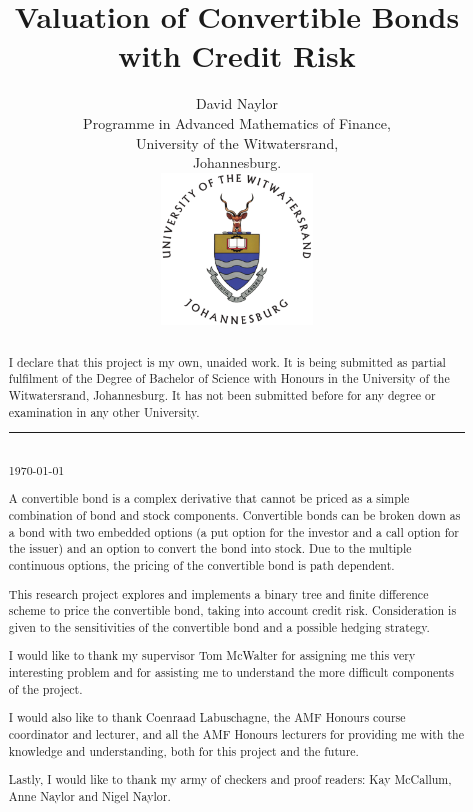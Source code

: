 \documentclass[a4paper,11pt,oneside]{report}
\title{Valuation of Convertible Bonds with Credit Risk}
\author{David Naylor\\[2cm]
Programme in Advanced Mathematics of Finance,\\
University of the Witwatersrand,\\
Johannesburg.\\[2cm]
\includegraphics[width=4cm]{../common/WitsColourLogo}\\[2cm]
}
\newcommand{\setlinespacing}[1]
           {\renewcommand{\baselinestretch}{#1}\small\normalsize}
\theoremstyle{plain}
\theoremstyle{definition}
\begin{document}
\maketitle \setlinespacing{1.20}


\def\abstractname{\Huge Declaration}
\begin{abstract}
I declare that this project is my own, unaided work. It is being submitted as partial fulfilment of the Degree of Bachelor of Science with Honours in the University of the Witwatersrand, Johannesburg. It has not been submitted before for any degree or examination in any other University.\\[3cm]
\noindent\rule{5cm}{0.5pt}\\[1cm]
\noindent \today
\end{abstract}


\def\abstractname{\Huge Abstract}
\begin{abstract}
A convertible bond is a complex derivative that cannot be priced as a simple combination of bond and stock components.  Convertible bonds can be broken down as a bond with two embedded options (a put option for the investor and a call option for the issuer) and an option to convert the bond into stock.  Due to the multiple continuous options, the pricing of the convertible bond is path dependent.

This research project explores and implements a binary tree and finite difference scheme to price the convertible bond, taking into account credit risk.  Consideration is given to the sensitivities of the convertible bond and a possible hedging strategy.
\end{abstract}


\def\abstractname{\Huge Acknowledgements}
\begin{abstract}
I would like to thank my supervisor Tom McWalter for assigning me this very interesting problem and for assisting me to understand the more difficult components of the project.

I would also like to thank Coenraad Labuschagne, the AMF Honours course coordinator and lecturer, and all the AMF Honours lecturers for providing me with the knowledge and understanding, both for this project and the future.

Lastly, I would like to thank my army of checkers and proof readers: Kay \mbox{McCallum}, Anne Naylor and Nigel Naylor.
\end{abstract}
\end{document}
